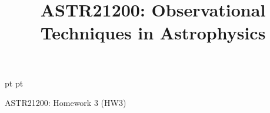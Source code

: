 \documentclass[11pt]{article}
\title{ASTR21200: Observational Techniques in Astrophysics}
\begin{document}

 pt
 pt




{\large{ASTR21200: Homework 3 (HW3)}}
\end{document}
